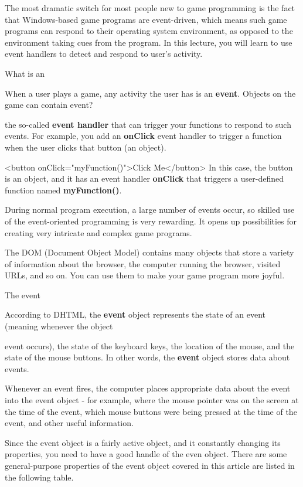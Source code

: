 \documentclass[
]{article}
\begin{document}
The most dramatic switch for most people new to game programming is the
fact that Windows-based game programs are event-driven, which means such
game programs can respond to their operating system environment, as
opposed to the environment taking cues from the program. In this
lecture, you will learn to use event handlers to detect and respond to
user's activity.

What is an

When a user plays a game, any activity the user has is an
\textbf{event}. Objects on the game can contain event?

the so-called \textbf{event handler} that can trigger your functions to
respond to such events. For example, you add an \textbf{onClick} event
handler to trigger a function when the user clicks that button (an
object).

\textless button onClick="myFunction()"\textgreater Click
Me\textless/button\textgreater{} In this case, the button is an object,
and it has an event handler \textbf{onClick} that triggers a
user-defined function named \textbf{myFunction()}.

During normal program execution, a large number of events occur, so
skilled use of the event-oriented programming is very rewarding. It
opens up possibilities for creating very intricate and complex game
programs.

The DOM (Document Object Model) contains many objects that store a
variety of information about the browser, the computer running the
browser, visited URLs, and so on. You can use them to make your game
program more joyful.

The event

According to DHTML, the \textbf{event} object represents the state of an
event (meaning whenever the object

event occurs), the state of the keyboard keys, the location of the
mouse, and the state of the mouse buttons. In other words, the
\textbf{event} object stores data about events.

Whenever an event fires, the computer places appropriate data about the
event into the event object - for example, where the mouse pointer was
on the screen at the time of the event, which mouse buttons were being
pressed at the time of the event, and other useful information.

Since the event object is a fairly active object, and it constantly
changing its properties, you need to have a good handle of the even
object. There are some general-purpose properties of the event object
covered in this article are listed in the following table.
\end{document}
